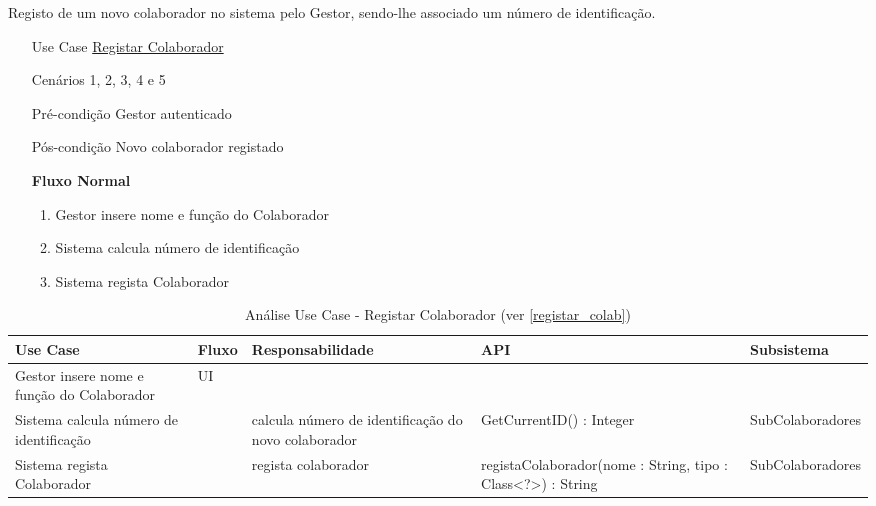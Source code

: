 \documentclass[../relatorio.tex]{subfiles}
\begin{document}
Registo de um novo colaborador no sistema pelo Gestor, sendo-lhe associado um número de identificação.
\begin{itemize}
    \item[Use Case] {\underline{Registar Colaborador}}
    \item[Cenários] {1, 2, 3, 4 e 5} 
    \item[Pré-condição] {Gestor autenticado}
    \item[Pós-condição] {Novo colaborador registado}
            \begin{flushleft}
                \textbf{Fluxo Normal}
            \end{flushleft}
            \begin{enumerate}
                \item Gestor insere nome e função do Colaborador
                \item Sistema calcula número de identificação
                \item Sistema regista Colaborador
            \end{enumerate}
\end{itemize}
\begin{landscape}
    \begin{table}[!h]
        \centering
        \begin{tabular}{|p{5cm}|p{1cm}|p{4cm}|p{6cm}|p{3cm}|}
            \hline
            \rowcolor{gray!20!white}
            Use Case & Fluxo                                            & Responsabilidade & API & Subsistema \\
            \hline
            \rowcolor{yellow}
            Gestor insere nome e função do Colaborador
                     & UI
                     & 
                     & 
                     & 
            \\
            \hline
            Sistema calcula número de identificação
                     & 
                     & calcula número de identificação do novo colaborador
                     & GetCurrentID() : Integer
                     & SubColaboradores
            \\
            \hline
            Sistema regista Colaborador
                     & 
                     & regista colaborador
                     & registaColaborador(nome : String, tipo : Class<?>) : String
                     & SubColaboradores
            \\
            \hline
        \end{tabular}
        \caption{Análise Use Case - Registar Colaborador (ver \ref{registar_colab})}
    \end{table}
\end{landscape}
\end{document}
